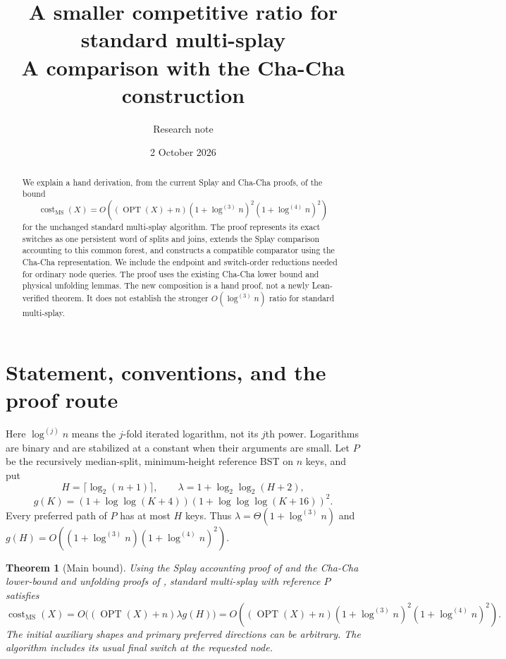 \documentclass[11pt]{article}
\title{A smaller competitive ratio for standard multi-splay\\
\large A comparison with the Cha-Cha construction}
\author{Research note}
\date{2 October 2026}
\numberwithin{equation}{section}
\newtheorem{theorem}{Theorem}[section]
\newcommand{\cost}{\operatorname{cost}}
\newcommand{\OPT}{\operatorname{OPT}}
\newcommand{\MS}{\mathrm{MS}}
\newcommand{\lgit}[1]{\log^{(#1)}}
\begin{document}
\maketitle
\begin{abstract}
We explain a hand derivation, from the current Splay and Cha-Cha
proofs, of the bound
\[
 \cost_{\MS}(X)=O\!\left((\OPT(X)+n)
 (1+\lgit{3}n)^2(1+\lgit{4}n)^2\right)
\]
for the unchanged standard multi-splay algorithm. The proof represents
its exact switches as one persistent word of splits and joins, extends
the Splay comparison accounting to this common forest, and constructs
a compatible comparator using the Cha-Cha representation.
We include the endpoint and switch-order reductions needed for ordinary
node queries. The proof uses the existing Cha-Cha lower bound
and physical unfolding lemmas. The new composition is a hand proof,
not a newly Lean-verified theorem. It does not establish the stronger
$O(\lgit{3}n)$ ratio for standard multi-splay.
\end{abstract}

\section{Statement, conventions, and the proof route}

Here $\lgit{j}n$ means the $j$-fold iterated logarithm, not its $j$th
power. Logarithms are binary and are stabilized at a constant when
their arguments are small. Let $P$ be the recursively median-split,
minimum-height reference BST on $n$ keys, and put
\[
 H=\lceil\log_2(n+1)\rceil,\qquad
 \lambda=1+\log_2\log_2(H+2),
\]
\[
 g(K)=(1+\log\log(K+4))(1+\log\log\log(K+16))^2.
\]
Every preferred path of $P$ has at most $H$ keys. Thus
$\lambda=\Theta(1+\lgit{3}n)$ and
$g(H)=O((1+\lgit{3}n)(1+\lgit{4}n)^2)$.

\begin{theorem}[Main bound]\label{thm:main}
Using the Splay accounting proof of \cite{Splay} and the Cha-Cha
lower-bound and unfolding proofs of \cite{ChaCha}, standard multi-splay
with reference $P$ satisfies
\begin{equation}\label{eq:main}
 \cost_{\MS}(X)
 =O\bigl((\OPT(X)+n)\lambda g(H)\bigr)
 =O\!\left((\OPT(X)+n)(1+\lgit{3}n)^2(1+\lgit{4}n)^2\right).
\end{equation}
The initial auxiliary shapes and primary preferred directions can be
arbitrary. The algorithm includes its usual final switch at the
requested node.
\end{theorem}
\end{document}
